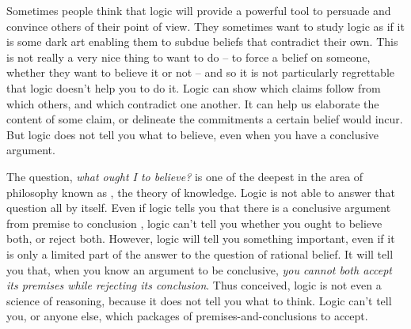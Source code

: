 Sometimes people think that logic will provide a powerful tool to persuade and convince others of their point of view. They sometimes want to study logic as if it is some dark art enabling them to subdue beliefs that contradict their own. This is not really a very nice thing to want to do – to force a belief on someone, whether they want to believe it or not – and so it is not particularly regrettable that logic doesn't help you to do it. Logic can show which claims follow from which others, and which contradict one another. It can help us elaborate the content of some claim, or delineate the commitments a certain belief would incur. But logic does not tell you what to believe, even when you have a conclusive argument.


The question, \emph{what ought I to believe?} is one of the deepest in the area of philosophy known as , the theory of knowledge. Logic is not able to answer that question all by itself. Even if logic tells you that there is a conclusive argument from premise  to conclusion , logic can't tell you whether you ought to believe both, or reject both. However, logic will tell you something important, even if it is only a limited part of the answer to the question of rational belief. It will tell you that, when you know an argument to be conclusive, \emph{you cannot both accept its premises while rejecting its conclusion}. Thus conceived, logic is not even a science of reasoning, because it does not tell you what to think. Logic can't tell you, or anyone else, which packages of premises-and-conclusions to accept.


